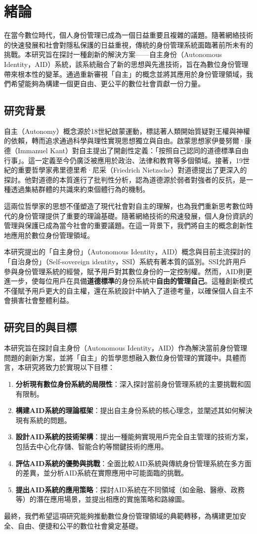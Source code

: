 
\chapter{緒論}
在當今數位時代，個人身份管理已成為一個日益重要且複雜的議題。隨著網絡技術的快速發展和社會對隱私保護的日益重視，傳統的身份管理系統面臨著前所未有的挑戰。本研究旨在探討一種創新的解決方案——自主身份（Autonomous Identity，AID）系統，該系統融合了新的思想與先進技術，旨在為數位身份管理帶來根本性的變革。通過重新審視「自主」的概念並將其應用於身份管理領域，我們希望能夠為構建一個更自由、更公平的數位社會貢獻一份力量。
\section{研究背景}
自主（Autonomy）概念源於18世紀啟蒙運動，標誌著人類開始質疑對王權與神權的依賴，轉而追求通過科學與理性實現思想獨立與自由。啟蒙思想家伊曼努爾·康德（Immanuel Kant）對自主提出了開創性定義：「按照自己認同的道德標準自由行事」。這一定義至今仍廣泛被應用於政治、法律和教育等多個領域。接著，19世紀的重要哲學家弗里德里希·尼采（Friedrich Nietzsche）對道德提出了更深入的探討。他對道德的本質進行了批判性分析，認為道德源於弱者對強者的反抗，是一種透過集結群體的共識來約束個體行為的機制。

這兩位哲學家的思想不僅塑造了現代社會對自主的理解，也為我們重新思考數位時代的身份管理提供了重要的理論基礎。隨著網絡技術的飛速發展，個人身份資訊的管理與保護已成為當今社會的重要議題。在這一背景下，我們將自主的概念創新性地應用於數位身份管理領域。

本研究提出的「自主身份」（Autonomous Identity，AID）概念與目前主流探討的「自治身份」（Self-sovereign identity，SSI）系統有著本質的區別。SSI允許用戶參與身份管理系統的經營，賦予用戶對其數位身份的一定控制權。然而，AID則更進一步，使每位用戶在具備\textbf{道德標準}的身份系統中\textbf{自由的管理自己}。這種創新模式不僅賦予用戶更大的自主權，還在系統設計中納入了道德考量，以確保個人自主不會損害社會整體利益。
\section{研究目的與目標}
本研究旨在探討自主身份（Autonomous Identity，AID）作為解決當前身份管理問題的創新方案，並將「自主」的哲學思想融入數位身份管理的實踐中。具體而言，本研究將致力於實現以下目標：
\begin{enumerate}
  \item \textbf{分析現有數位身份系統的局限性}：深入探討當前身份管理系統的主要挑戰和固有限制。
  \item \textbf{構建AID系統的理論框架}：提出自主身份系統的核心理念，並闡述其如何解決現有系統的問題。
  \item \textbf{設計AID系統的技術架構}：提出一種能夠實現用戶完全自主管理的技術方案，包括去中心化存儲、智能合約等關鍵技術的應用。
  \item \textbf{評估AID系統的優勢與挑戰}：全面比較AID系統與傳統身份管理系統在多方面的差異，並分析AID系統在實際應用中可能面臨的挑戰。
  \item \textbf{提出AID系統的應用策略}：探討AID系統在不同領域（如金融、醫療、政務等）的潛在應用場景，並提出相應的實施策略和路線圖。
\end{enumerate}
最終，我們希望這項研究能夠推動數位身份管理領域的典範轉移，為構建更加安全、自由、便捷和公平的數位社會奠定基礎。
